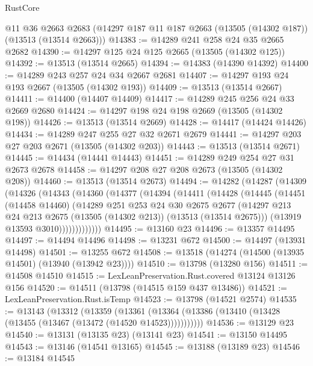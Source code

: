 \begin{lexlean}{RustCore}
\begin{coremodule}
    @11
    @36
    @2663
    @2683
    (@14297 @187 @11 @187 @2663 (@13505 (@14302 @187)) (@13513 (@13514 @2663)))
@14383 := @14289 @241 @258 @24 @35 @2665 @2682
@14390 := @14297 @125 @24 @125 @2665 (@13505 (@14302 @125))
@14392 := @13513 (@13514 @2665)
@14394 := @14383 (@14390 @14392)
@14400 := @14289 @243 @257 @24 @34 @2667 @2681
@14407 := @14297 @193 @24 @193 @2667 (@13505 (@14302 @193))
@14409 := @13513 (@13514 @2667)
@14411 := @14400 (@14407 @14409)
@14417 := @14289 @245 @256 @24 @33 @2669 @2680
@14424 := @14297 @198 @24 @198 @2669 (@13505 (@14302 @198))
@14426 := @13513 (@13514 @2669)
@14428 := @14417 (@14424 @14426)
@14434 := @14289 @247 @255 @27 @32 @2671 @2679
@14441 := @14297 @203 @27 @203 @2671 (@13505 (@14302 @203))
@14443 := @13513 (@13514 @2671)
@14445 := @14434 (@14441 @14443)
@14451 := @14289 @249 @254 @27 @31 @2673 @2678
@14458 := @14297 @208 @27 @208 @2673 (@13505 (@14302 @208))
@14460 := @13513 (@13514 @2673)
@14494 := @14282
    (@14287
      (@14309
        (@14326
          (@14343
            (@14360
              (@14377
                (@14394
                  (@14411
                    (@14428
                      (@14445
                        (@14451
                          (@14458 @14460)
                          (@14289
                            @251
                            @253
                            @24
                            @30
                            @2675
                            @2677
                            (@14297
                              @213
                              @24
                              @213
                              @2675
                              (@13505 (@14302 @213))
                              (@13513 (@13514 @2675)))
                            (@13919 @13593 @3010)))))))))))))
@14495 := @13160 @23
@14496 := @13357 @14495
@14497 := @14494 @14496
@14498 := @13231 @672
@14500 := @14497 (@13931 @14498)
@14501 := @13255 @672
@14508 := @13518 (@14274 (@14500 (@13935 @14501) (@13940 (@13942 @23))))
@14510 := @13798 (@13280 @156)
@14511 := @14508 @14510
@14515 := LexLeanPreservation.Rust.covered @13124 @13126 @156
@14520 := @14511 (@13798 (@14515 @159 @437 @13486))
@14521 := LexLeanPreservation.Rust.isTemp
@14523 := @13798 (@14521 @2574)
@14535 := @13143
    (@13312
      (@13359
        (@13361 (@13364 (@13386 (@13410 (@13428 (@13455 (@13467 (@13472 (@14520 @14523)))))))))))
@14536 := @13129 @23
@14540 := @13131 (@13135 @23) (@13141 @23)
@14541 := @13150 @14495
@14543 := @13146 (@14541 @13165)
@14545 := @13188 (@13189 @23)
@14546 := @13184 @14545

\end{coremodule}
\end{lexlean}
